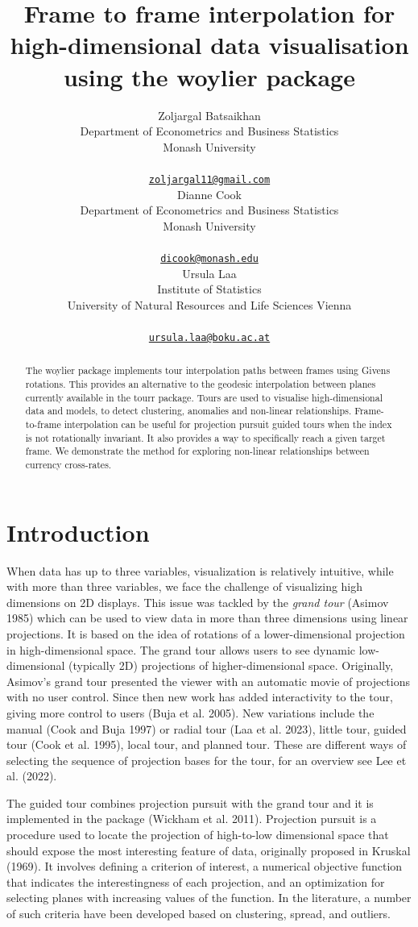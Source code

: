 \documentclass{article}
\title{Frame to frame interpolation for high-dimensional data
visualisation using the woylier package}
\author{
    Zoljargal Batsaikhan
   \\
    Department of Econometrics and Business Statistics \\
    Monash University \\
   \\
  \texttt{\href{mailto:zoljargal11@gmail.com}{\nolinkurl{zoljargal11@gmail.com}}} \\
   \And
    Dianne Cook
   \\
    Department of Econometrics and Business Statistics \\
    Monash University \\
   \\
  \texttt{\href{mailto:dicook@monash.edu}{\nolinkurl{dicook@monash.edu}}} \\
   \And
    Ursula Laa
   \\
    Institute of Statistics \\
    University of Natural Resources and Life Sciences Vienna \\
   \\
  \texttt{\href{mailto:ursula.laa@boku.ac.at}{\nolinkurl{ursula.laa@boku.ac.at}}} \\
  }
\begin{document}
\maketitle


\begin{abstract}
The woylier package implements tour interpolation paths between frames
using Givens rotations. This provides an alternative to the geodesic
interpolation between planes currently available in the tourr package.
Tours are used to visualise high-dimensional data and models, to detect
clustering, anomalies and non-linear relationships. Frame-to-frame
interpolation can be useful for projection pursuit guided tours when the
index is not rotationally invariant. It also provides a way to
specifically reach a given target frame. We demonstrate the method for
exploring non-linear relationships between currency cross-rates.
\end{abstract}


\hypertarget{introduction}{%
\section{Introduction}\label{introduction}}

When data has up to three variables, visualization is relatively
intuitive, while with more than three variables, we face the challenge
of visualizing high dimensions on 2D displays. This issue was tackled by
the \emph{grand tour} (Asimov 1985) which can be used to view data in
more than three dimensions using linear projections. It is based on the
idea of rotations of a lower-dimensional projection in high-dimensional
space. The grand tour allows users to see dynamic low-dimensional
(typically 2D) projections of higher-dimensional space. Originally,
Asimov's grand tour presented the viewer with an automatic movie of
projections with no user control. Since then new work has added
interactivity to the tour, giving more control to users (Buja et al.
2005). New variations include the manual (Cook and Buja 1997) or radial
tour (Laa et al. 2023), little tour, guided tour (Cook et al. 1995),
local tour, and planned tour. These are different ways of selecting the
sequence of projection bases for the tour, for an overview see Lee et
al. (2022).

The guided tour combines projection pursuit with the grand tour and it
is implemented in the  package (Wickham et al. 2011).
Projection pursuit is a procedure used to locate the projection of
high-to-low dimensional space that should expose the most interesting
feature of data, originally proposed in Kruskal (1969). It involves
defining a criterion of interest, a numerical objective function that
indicates the interestingness of each projection, and an optimization
for selecting planes with increasing values of the function. In the
literature, a number of such criteria have been developed based on
clustering, spread, and outliers.
\end{document}
